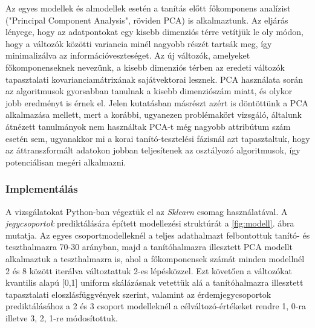 \documentclass[12pt]{article}
\begin{document}
Az egyes modellek és almodellek esetén a tanítás előtt főkomponens analízist ("Principal Component Analysis", röviden PCA) is alkalmaztunk. Az eljárás lényege, hogy az adatpontokat egy kisebb dimenziós térre vetítjük le oly módon, hogy a változók közötti variancia minél nagyobb részét tartsák meg, így minimalizálva az információveszteséget\cite{PCA}. Az új változók, amelyeket főkomponenseknek nevezünk, a kisebb dimenziós térben az eredeti változók tapasztalati kovarianciamátrixának sajátvektorai lesznek. PCA használata során az algoritmusok gyorsabban tanulnak a kisebb dimenziószám miatt, és olykor jobb eredményt is érnek el. Jelen kutatásban másrészt azért is döntöttünk a PCA alkalmazása mellett, mert a korábbi, ugyanezen problémakört vizsgáló, általunk átnézett tanulmányok nem használtak PCA-t még nagyobb attribútum szám esetén sem, ugyanakkor mi a korai tanító-tesztelési fázisnál azt tapasztaltuk, hogy az áttranszformált adatokon jobban teljesítenek az osztályozó algoritmusok, így potenciálisan megéri alkalmazni.

\subsubsection*{Implementálás}

A vizsgálatokat Python-ban végeztük el az \textit{Sklearn}\cite{sklearn} csomag használatával. A \textit{jegycsoportok} prediktálására épített modellezési struktúrát a \ref{fig:modell}. ábra mutatja. Az egyes csoportmodelleknél a teljes adathalmazt felbontottuk tanító- és teszthalmazra 70-30 arányban, majd a tanítóhalmazra illesztett PCA modellt alkalmaztuk a teszthalmazra is, ahol a főkomponensek számát minden modellnél 2 és 8 között iterálva változtattuk 2-es lépésközzel. Ezt követően a változókat kvantilis alapú [0,1] uniform skálázásnak vetettük alá a tanítóhalmazra illesztett tapasztalati eloszlásfüggvények szerint, valamint az érdemjegycsoportok prediktálásához a 2 és 3 csoport modelleknél a célváltozó-értékeket rendre 1, 0-ra illetve 3, 2, 1-re módosítottuk. 
\end{document}
